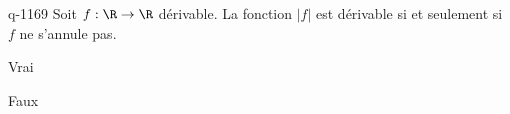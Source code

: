 \begin{truefalse}{q-1169}
Soit $f:\R\to\R$ dérivable. La fonction $|f|$ est dérivable si et seulement si $f$ ne s'annule pas.
\item Vrai
\item* Faux
\end{truefalse}

